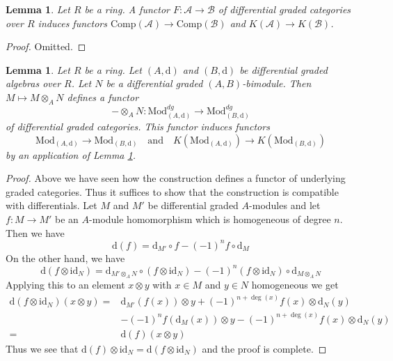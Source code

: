\documentclass{stacks-project}
\theoremstyle{plain}
\newtheorem{lemma}[subsection]{Lemma}
\theoremstyle{definition}
\theoremstyle{remark}
\numberwithin{equation}{subsection}
\begin{document}
\begin{lemma}
\label{lemma-functorial}
Let $R$ be a ring. A functor $F : \mathcal{A} \to \mathcal{B}$
of differential graded categories over $R$ induces functors
$\text{Comp}(\mathcal{A}) \to \text{Comp}(\mathcal{B})$
and $K(\mathcal{A}) \to K(\mathcal{B})$.
\end{lemma}

\begin{proof}
Omitted.
\end{proof}

\begin{lemma}
\label{lemma-tensor}
Let $R$ be a ring. Let $(A, \text{d})$ and $(B, \text{d})$
be differential graded algebras over $R$. Let $N$ be a
differential graded $(A, B)$-bimodule. Then
$M \mapsto M \otimes_A N$ defines a functor
$$
- \otimes_A N :
\text{Mod}^{dg}_{(A, \text{d})}
\longrightarrow
\text{Mod}^{dg}_{(B, \text{d})}
$$
of differential graded categories. This functor induces functors
$$
\text{Mod}_{(A, \text{d})} \to \text{Mod}_{(B, \text{d})}
\quad\text{and}\quad
K(\text{Mod}_{(A, \text{d})}) \to K(\text{Mod}_{(B, \text{d})})
$$
by an application of Lemma \ref{lemma-functorial}.
\end{lemma}

\begin{proof}
Above we have seen how the construction defines a functor of underlying
graded categories. Thus it suffices to show that the construction is
compatible with differentials. Let $M$ and $M'$ be differential
graded $A$-modules and let $f : M \to M'$ be an $A$-module homomorphism
which is homogeneous of degree $n$. Then we have
$$
\text{d}(f) = \text{d}_{M'} \circ f - (-1)^n f \circ \text{d}_M
$$
On the other hand, we have
$$
\text{d}(f \otimes \text{id}_N) =
\text{d}_{M' \otimes_A N} \circ
(f \otimes \text{id}_N)
- (-1)^n
(f \otimes \text{id}_N) \circ \text{d}_{M \otimes_A N}
$$
Applying this to an element $x \otimes y$ with $x \in M$ and
$y \in N$ homogeneous we get
\begin{align*}
\text{d}(f \otimes \text{id}_N)(x \otimes y)
= &
\text{d}_{M'}(f(x)) \otimes y + (-1)^{n + \deg(x)}f(x) \otimes \text{d}_N(y) \\
& - (-1)^n f(\text{d}_M(x)) \otimes y
- (-1)^{n + \deg(x)}f(x) \otimes \text{d}_N(y) \\
= &
\text{d}(f) (x \otimes y)
\end{align*}
Thus we see that $\text{d}(f) \otimes \text{id}_N =
\text{d}(f \otimes \text{id}_N)$ and the proof is complete.
\end{proof}
\end{document}
